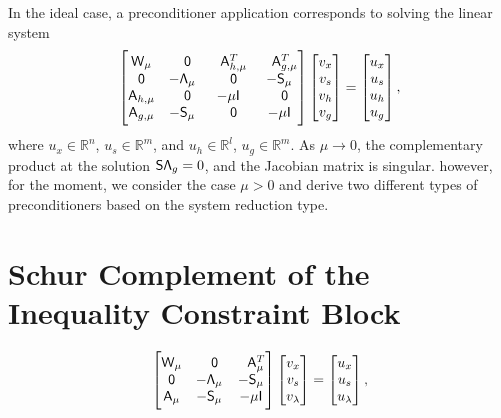In the ideal case, a preconditioner application corresponds to solving the
linear system
\begin{equation}\label{eq:ideal_precond}
  \begin{bmatrix} 
	\mathsf{W}_\mu & \phantom{-}\mathsf{0} & \phantom{-}\mathsf{A}_{h,\mu}^T  & \phantom{-}\mathsf{A}_{g,\mu}^T \\
	\mathsf{0}  & -\mathsf{\Lambda}_\mu & \phantom{-}\mathsf{0}   & -\mathsf{S}_\mu \\
	\mathsf{A}_{h, \mu} & \phantom{-}\mathsf{0} &  -\mu \mathsf{I} & \phantom{-}\mathsf{0}  \\
	\mathsf{A}_{g, \mu} & -\mathsf{S}_\mu &  \phantom{-}\mathsf{0}     &   -\mu \mathsf{I}
\end{bmatrix}
\begin{bmatrix} v_x \\ v_s \\ v_{h} \\  v_{g} \end{bmatrix} 
= 
\begin{bmatrix} u_x \\ u_s \\ u_{h} \\ u_{g}  \end{bmatrix},
\end{equation}
where $u_x \in \mathbb{R}^n$, $u_s \in \mathbb{R}^{m}$, and $u_h \in
\mathbb{R}^{l}$,  $u_g \in \mathbb{R}^{m}$. As $\mu \rightarrow 0$, the complementary product 
at the solution $ \mathsf{S} \mathsf{\Lambda}_g = 0$, and the Jacobian matrix is singular.  
however, for the moment, we consider the case $\mu > 0$ and derive two different types of preconditioners based on the system reduction type. 

\section{Schur Complement of the Inequality Constraint Block}
\begin{equation}\label{eq:ideal_precond}
  \begin{bmatrix} 
	\mathsf{W}_\mu & \phantom{-}\mathsf{0} &  \phantom{-}\mathsf{A}_\mu^T \\
	\mathsf{0}  & -\mathsf{\Lambda}_\mu & -\mathsf{S}_\mu \\
	\mathsf{A}_\mu & -\mathsf{S}_\mu & -\mu \mathsf{I}
\end{bmatrix}
\begin{bmatrix} v_x \\ v_s \\ v_\lambda \end{bmatrix} 
= 
\begin{bmatrix} u_x \\ u_s \\ u_\lambda \end{bmatrix},
\end{equation}


